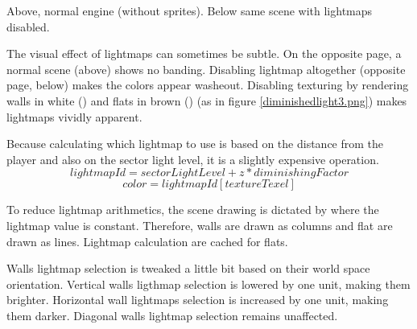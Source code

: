
Above, normal engine (without sprites). Below same scene with lightmaps disabled.
\vspace{2mm}



\par
The visual effect of lightmaps can sometimes be subtle. On the opposite page, a normal scene (above) shows no banding. Disabling lightmap altogether (opposite page, below) makes the colors appear washeout. Disabling texturing by rendering walls in white () and flats in brown () (as in figure \ref{diminishedlight3.png}) makes lightmaps vividly apparent.\\
\par
Because calculating which lightmap to use is based on the distance from the player and also on the sector light level, it is a slightly expensive operation.\\
$$ lightmapId = sectorLightLevel + z * diminishingFactor $$
$$   color = lightmapId[textureTexel] $$
\par
 To reduce lightmap arithmetics, the scene drawing is dictated by where the lightmap value is constant. Therefore, walls are drawn as columns and flat are drawn as lines. Lightmap calculation are cached for flats.\\%
 \par
 Walls lightmap selection is tweaked a little bit based on their world space orientation. Vertical walls ligthmap selection is lowered by one unit, making them brighter. Horizontal wall lightmaps selection is increased by one unit, making them darker. Diagonal walls lightmap selection remains unaffected.\\
\pagebreak


